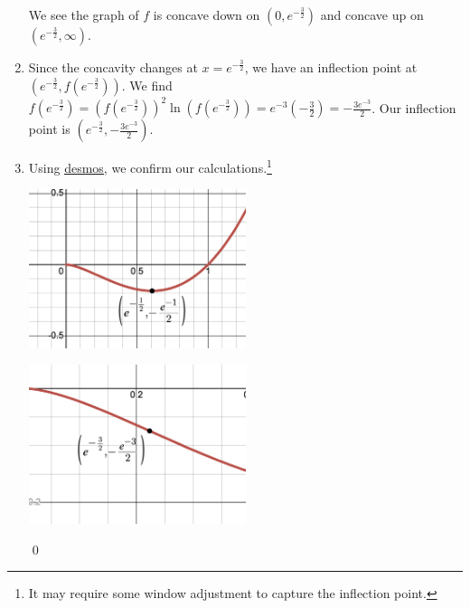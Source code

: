\begin{ex}
\begin{enumerate}
\begin{center}
\begin{multicols}{2}
\end{multicols}
\end{center}

We see the graph of $f$ is concave down on $\left(0, e^{-\frac{3}{2}} \right)$ and concave up on $\left(e^{-\frac{3}{2}} , \infty \right)$.


\item  Since the concavity changes at $x = e^{-\frac{3}{2}}$, we have an inflection point at $\left( e^{-\frac{3}{2}}, f \left(e^{-\frac{3}{2}}\right) \right)$.  We find $f \left(e^{-\frac{3}{2}}\right)  = \left(f \left(e^{-\frac{3}{2}}\right) \right)^2 \ln \left(f \left(e^{-\frac{3}{2}}\right) \right) = e^{-3} \left(-\frac{3}{2} \right) = -\frac{3e^{-3}}{2}$.  Our inflection point is $\left( e^{-\frac{3}{2}},  -\frac{3e^{-3}}{2} \right)$.

\item  Using  \href{https://www.desmos.com/calculator}{\underline{desmos}}, we confirm our calculations.\footnote{It may require some window adjustment to capture the inflection point.}

\begin{center}

\begin{multicols}{2}

\includegraphics[width=2.5in]{./LogarithmicEquationsandInequalitiesGraphics/x^2ln(x)min.PNG}

\includegraphics[width=2.5in]{./LogarithmicEquationsandInequalitiesGraphics/x^2ln(x)IP.PNG} \\

\end{multicols}

\end{center}

\hfill \qed

\end{enumerate}

\end{ex}

